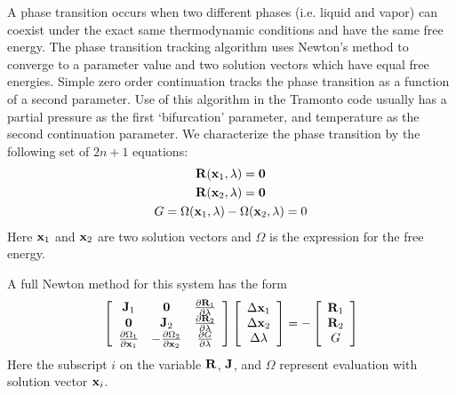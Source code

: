 A phase transition occurs when two different phases (i.e. liquid and vapor) can coexist under the exact same thermodynamic conditions and have the same free energy.
The phase transition tracking algorithm uses Newton's method to converge to a parameter value and two solution vectors which have equal free energies. Simple zero order continuation tracks the phase transition as a function of a second parameter. Use of this algorithm in the Tramonto code usually has a partial pressure as the first `bifurcation' parameter, and temperature as the second continuation parameter. We characterize the phase transition by the following set of  $2n+1$ equations:
\begin{gather}
\label{eq:pt}
{\bf R}({\bf x}_1,\lambda)={\bf 0} \\
{\bf R}({\bf x}_2,\lambda)={\bf 0} \\
G = \Omega({\bf x}_1,\lambda) - \Omega({\bf x}_2,\lambda) = 0 \label{eq:ptenergy}
\end{gather}
Here ${\bf x}_1$ and ${\bf x}_2$ are two solution vectors and $\Omega$ is the expression for the free energy.

A full Newton method for this system has the form
\begin{equation}
\label{eq:ptn}
\left[\begin{array}{ccc}
{\bf J}_1 & {\bf 0} & \frac{\partial {\bf R}_1}{\partial \lambda} \\
{\bf 0} & {\bf J}_2 & \frac{\partial {\bf R}_2}{\partial \lambda} \\
\frac{\partial \Omega_1}{\partial {\bf x}_1} & -\frac{\partial \Omega_2}{\partial {\bf x}_2} &  \frac{\partial G}{\partial \lambda}
\end{array}\right]
\left[\begin{array}{c}
\Delta{\bf x}_1 \\
\Delta{\bf x}_2 \\
\Delta\lambda
\end{array}\right]
= -
\left[\begin{array}{c}
{\bf R}_1 \\
{\bf R}_2 \\
G
\end{array}\right]
\end{equation}
Here the subscript $i$ on the variable ${\bf R}$, ${\bf J}$, and $\Omega$ represent evaluation with solution vector ${\bf x}_i$.

